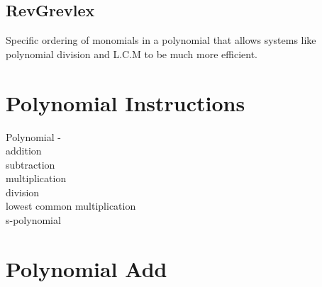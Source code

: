 \documentclass[20pt]{extarticle}
\begin{document}
\subsection*{RevGrevlex}

Specific ordering of monomials in a polynomial that allows systems like polynomial division and L.C.M to be much more efficient.


\newpage
\section*{Polynomial Instructions}

Polynomial - \\
\indent addition \\
\indent subtraction     \\   
\indent multiplication \\
\indent division \\
\indent lowest common multiplication \\
\indent s-polynomial \\


\newpage
\section*{Polynomial Add}
\end{document}
